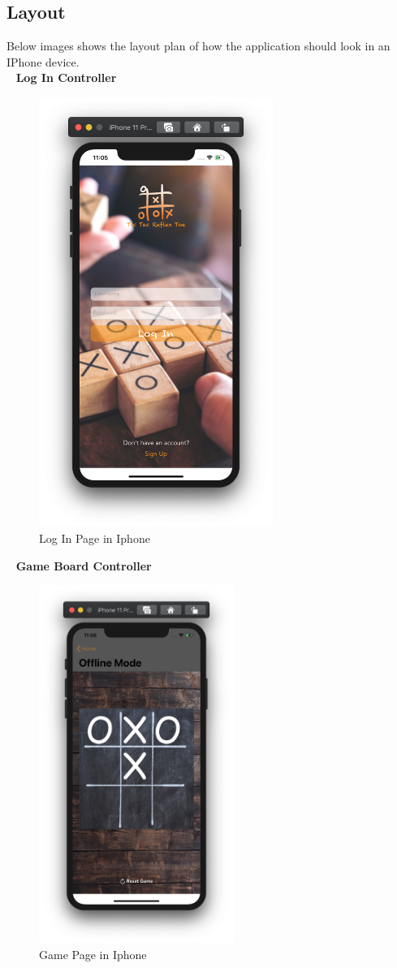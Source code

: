 \documentclass{article}
\begin{document}
    \subsection{Layout}
        Below images shows the layout plan of how the application should look in an IPhone device.\\
        ~\newline
        \textbf{Log In Controller}
        \begin{figure}[h]
        \centering
        \includegraphics[width=3in]{images/login.png}
        \caption{Log In Page in Iphone}
        \end{figure}
        ~\newpage
        \textbf{Game Board Controller}
        \begin{figure}[h]
        \centering
        \includegraphics[width=2.5in]{images/board.png}
        \caption{Game Page in Iphone}
        \end{figure}
\end{document}
